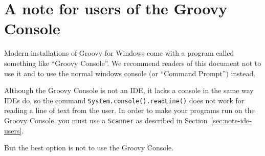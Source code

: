 \section{A note for users of the Groovy Console}
\label{sec:note-ide-console-groovy-users}

Modern installations of Groovy for Windows come with a program called
something like ``Groovy Console''. We recommend readers of this
document not to use it and to use the normal windows console (or
``Command Prompt'') instead. 

Although the Groovy Console is not an IDE, it lacks a console in
the same way IDEs do, so the command
\verb+System.console().readLine()+ does not work for reading a line of
text from the user. In order to make your programs run on the Groovy
Console, you must use a \verb+Scanner+ as described in
Section~\ref{sec:note-ide-users}. 

But the best option is not to use the Groovy Console. 


